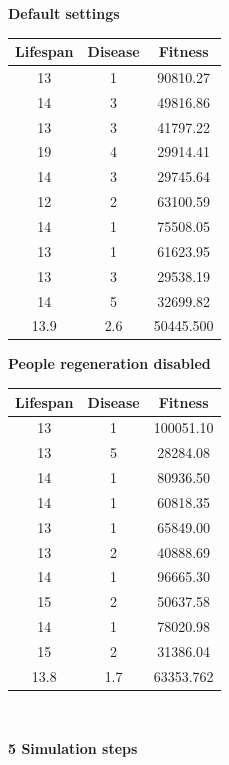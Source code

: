 \documentclass[conference,compsoc]{IEEEtran}
\begin{document}
\begin{table}[!t]
\begin{center}
\begin{minipage}{0.25\textwidth}
\centering
\textbf{Default settings}\\
	\begin{tabular}{|c|c|c|}
	\hline
	Lifespan & Disease & Fitness\\
	\hline
	13 & 1 & 90810.27\\
	14 & 3 & 49816.86\\
	13 & 3 & 41797.22\\
	19 & 4 & 29914.41\\
	14 & 3 & 29745.64\\
	12 & 2 & 63100.59\\
	14 & 1 & 75508.05\\
	13 & 1 & 61623.95\\
	13 & 3 & 29538.19\\
	14 & 5 & 32699.82\\
	\hline
	13.9 & 2.6 & 50445.500\\
	\hline
	\end{tabular}
\end{minipage}%
\begin{minipage}{0.25\textwidth}
\centering
\textbf{People regeneration disabled}\\
	\begin{tabular}{|c|c|c|}
	\hline
	Lifespan & Disease & Fitness\\
	\hline
	13 & 1 & 100051.10\\
	13 & 5 &  28284.08\\
	14 & 1 &  80936.50\\
	14 & 1 &  60818.35\\
	13 & 1 &  65849.00\\
	13 & 2 &  40888.69\\
	14 & 1 &  96665.30\\
	15 & 2 &  50637.58\\
	14 & 1 &  78020.98\\
	15 & 2 &  31386.04\\
	\hline
	13.8 & 1.7 & 63353.762\\
	\hline
	\end{tabular}
\end{minipage}%
\\[3ex]
\begin{minipage}{0.25\textwidth}
\centering
\textbf{5 Simulation steps}\\
	\begin{tabular}{|c|c|c|}

\end{tabular}
\end{minipage}
\end{center}
\end{table}
\end{document}
